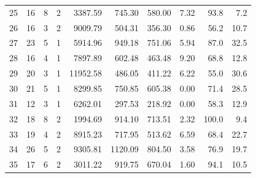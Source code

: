 \begin{longtable}{rrrrrrrrrr}
25 & 16 & 8 & 2 & 3387.59 & 745.30 & 580.00 & 7.32 & 93.8 & 7.2 \\
26 & 16 & 3 & 2 & 9009.79 & 504.31 & 356.30 & 0.86 & 56.2 & 10.7 \\
27 & 23 & 5 & 1 & 5914.96 & 949.18 & 751.06 & 5.94 & 87.0 & 32.5 \\
28 & 16 & 4 & 1 & 7897.89 & 602.48 & 463.48 & 9.20 & 68.8 & 12.8 \\
29 & 20 & 3 & 1 & 11952.58 & 486.05 & 411.22 & 6.22 & 55.0 & 30.6 \\
30 & 21 & 5 & 1 & 8299.85 & 750.85 & 605.38 & 0.00 & 71.4 & 28.5 \\
31 & 12 & 3 & 1 & 6262.01 & 297.53 & 218.92 & 0.00 & 58.3 & 12.9 \\
32 & 18 & 8 & 2 & 1994.69 & 914.10 & 713.51 & 2.32 & 100.0 & 9.4 \\
33 & 19 & 4 & 2 & 8915.23 & 717.95 & 513.62 & 6.59 & 68.4 & 22.7 \\
34 & 26 & 5 & 2 & 9305.81 & 1120.09 & 804.50 & 3.58 & 76.9 & 19.7 \\
35 & 17 & 6 & 2 & 3011.22 & 919.75 & 670.04 & 1.60 & 94.1 & 10.5 \\

\end{longtable}

\endgroup
